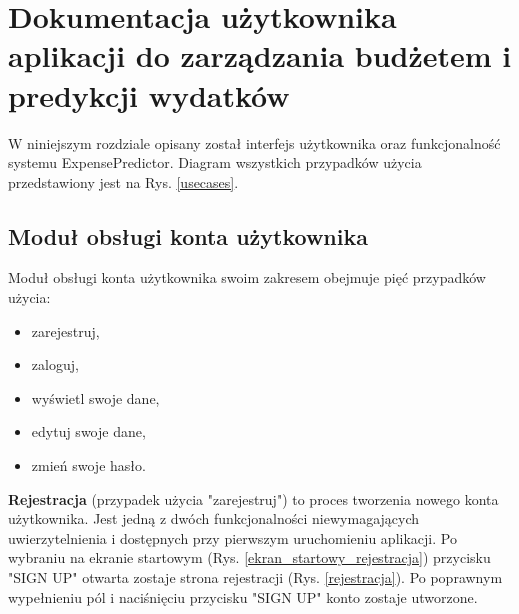 \chapter{Dokumentacja użytkownika aplikacji do zarządzania budżetem i predykcji wydatków}
W niniejszym rozdziale opisany został interfejs użytkownika oraz funkcjonalność systemu ExpensePredictor. Diagram wszystkich przypadków użycia przedstawiony jest na Rys. \ref{usecases}.
\section{Moduł obsługi konta użytkownika}
Moduł obsługi konta użytkownika swoim zakresem obejmuje pięć przypadków użycia:
\begin{itemize}
	\item zarejestruj,
	\item zaloguj,
	\item wyświetl swoje dane,
	\item edytuj swoje dane,
	\item zmień swoje hasło.
\end{itemize}
\textbf{Rejestracja} (przypadek użycia "zarejestruj") to proces tworzenia nowego konta użytkownika. Jest jedną z dwóch funkcjonalności niewymagających uwierzytelnienia i dostępnych przy pierwszym uruchomieniu aplikacji. Po wybraniu na ekranie startowym (Rys. \ref{ekran_startowy_rejestracja}) przycisku "SIGN UP" otwarta zostaje strona rejestracji (Rys. \ref{rejestracja}). Po poprawnym wypełnieniu pól i naciśnięciu przycisku "SIGN UP" konto zostaje utworzone.
